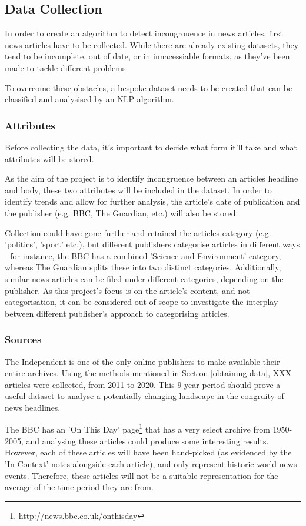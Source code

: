 \subsection{Data Collection}
In order to create an algorithm to detect incongrouence in news articles, first news articles have to be collected. While there are already existing datasets, they tend to be incomplete, out of date, or in innacessiable formats, as they've been made to tackle different problems. 

To overcome these obstacles, a bespoke dataset needs to be created that can be classified and analysised by an NLP algorithm.

\subsubsection{Attributes}
Before collecting the data, it's important to decide what form it'll take and what attributes will be stored.

As the aim of the project is to identify incongruence between an articles headline and body, these two attributes will be included in the dataset. In order to identify trends and allow for further analysis, the article's date of publication and the publisher (e.g. BBC, The Guardian, etc.) will also be stored.

Collection could have gone further and retained the articles category (e.g. 'politics', 'sport' etc.), but different publishers categorise articles in different ways - for instance, the BBC has a combined 'Science and Environment' category, whereas The Guardian splits these into two distinct categories. Additionally, similar news articles can be filed under different categories, depending on the publisher. As this project's focus is on the article's content, and not categorisation, it can be considered out of scope to investigate the interplay between different publisher's approach to categorising articles.

\subsubsection{Sources}
The Independent is one of the only online publishers to make available their entire archives. Using the methods mentioned in Section \ref{obtaining-data}, XXX articles were collected, from 2011 to 2020. This 9-year period should prove a useful dataset to analyse a potentially changing landscape in the congruity of news headlines.

The BBC has an 'On This Day' page\footnote{\url{http://news.bbc.co.uk/onthisday}} that has a very select archive from 1950-2005, and analysing these articles could produce some interesting results. However, each of these articles will have been hand-picked (as evidenced by the 'In Context' notes alongside each article), and only represent historic world news events. Therefore, these articles will not be a suitable representation for the average of the time period they are from.

